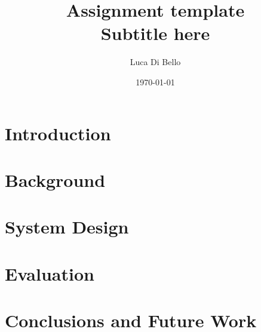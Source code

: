 \documentclass[a4paper, 11pt]{article}
\title{Assignment template \\[1ex] \large Subtitle here}
\author{Luca Di Bello}
\date{\today}
\begin{document}
\maketitle
\tableofcontents

\section{Introduction}

\pagebreak

\section{Background}

\pagebreak

\section{System Design}

\pagebreak

\section{Evaluation}

\pagebreak

\section{Conclusions and Future Work}

\nocite{*} %

\end{document}
